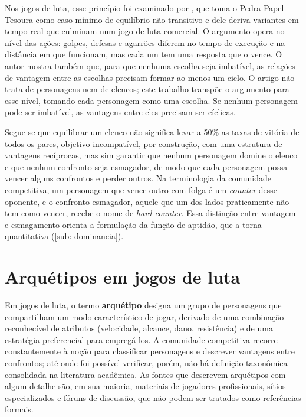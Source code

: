 Nos jogos de luta, esse princípio foi examinado por , que toma o Pedra-Papel-Tesoura como caso mínimo de equilíbrio não transitivo e dele deriva variantes em tempo real que culminam num jogo de luta comercial. O argumento opera no nível das ações: golpes, defesas e agarrões diferem no tempo de execução e na distância em que funcionam, mas cada um tem uma resposta que o vence. O autor mostra também que, para que nenhuma escolha seja imbatível, as relações de vantagem entre as escolhas precisam formar ao menos um ciclo. O artigo não trata de personagens nem de elencos; este trabalho transpõe o argumento para esse nível, tomando cada personagem como uma escolha. Se nenhum personagem pode ser imbatível, as vantagens entre eles precisam ser cíclicas.

Segue-se que equilibrar um elenco não significa levar a 50\% as taxas de vitória de todos os pares, objetivo incompatível, por construção, com uma estrutura de vantagens recíprocas, mas sim garantir que nenhum personagem domine o elenco e que nenhum confronto seja esmagador, de modo que cada personagem possa vencer alguns confrontos e perder outros. Na terminologia da comunidade competitiva, um personagem que vence outro com folga é um \textit{counter} desse oponente, e o confronto esmagador, aquele que um dos lados praticamente não tem como vencer, recebe o nome de \textit{hard counter}. Essa distinção entre vantagem e esmagamento orienta a formulação da função de aptidão, que a torna quantitativa (\autoref{sub: dominancia}).

\section{Arquétipos em jogos de luta}
\label{sec: arquetipos}

Em jogos de luta, o termo \textbf{arquétipo} designa um grupo de personagens que compartilham um modo característico de jogar, derivado de uma combinação reconhecível de atributos (velocidade, alcance, dano, resistência) e de uma estratégia preferencial para empregá-los. A comunidade competitiva recorre constantemente à noção para classificar personagens e descrever vantagens entre confrontos; até onde foi possível verificar, porém, não há definição taxonômica consolidada na literatura acadêmica. As fontes que descrevem arquétipos com algum detalhe são, em sua maioria, materiais de jogadores profissionais, sítios especializados e fóruns de discussão, que não podem ser tratados como referências formais.

